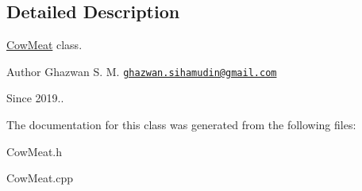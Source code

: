 \subsection{Detailed Description}
\hyperlink{classCowMeat}{Cow\+Meat} class.

\begin{DoxyAuthor}{Author}
Ghazwan S. M. \href{mailto:ghazwan.sihamudin@gmail.com}{\tt ghazwan.\+sihamudin@gmail.\+com} 
\end{DoxyAuthor}
\begin{DoxySince}{Since}
2019.. 
\end{DoxySince}


The documentation for this class was generated from the following files\+:\begin{DoxyCompactItemize}
\item 
Cow\+Meat.\+h\item 
Cow\+Meat.\+cpp\end{DoxyCompactItemize}

